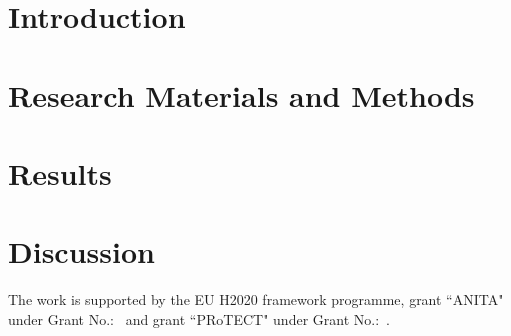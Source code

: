 \documentclass[manuscript, review, screen]{acmart}
\begin{document}
\section{Introduction}


\section{Research Materials and Methods}\label{mm}


\section{Results}\label{res}


\section{Discussion}\label{disc}

\begin{acks}

The work is supported by the EU H2020  framework programme, grant ``ANITA" under Grant No.:~ and grant ``PRoTECT" under Grant No.:~.

\end{acks}



\end{document}
